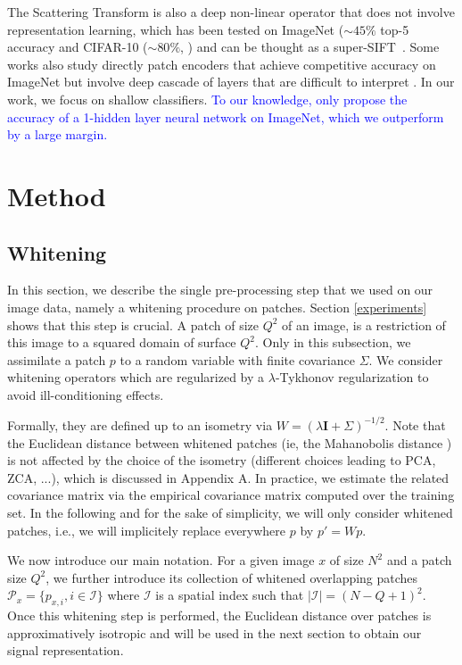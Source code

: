 \documentclass{article}
\newcommand{\Edouard}[1]{\textcolor{blue}{#1}}
\begin{document}
{The Scattering Transform \citep{mallat2012group} is also a deep non-linear operator that does not involve representation learning, which has been tested on ImageNet ($\sim 45\%$ top-5 accuracy \citep{zarka2019deep} and  CIFAR-10 ($\sim 80 \%$, \citep{Oyallon_2015_CVPR}) and can be thought as a super-SIFT~\citep{Oyallon_2018_ECCV}.
Some works also study directly patch encoders that achieve competitive accuracy on ImageNet but involve deep cascade of layers that are difficult to interpret \citep{oyallon2017scaling,zarka2019deep,brendel2019approximating}. In our work, we focus on shallow classifiers. \Edouard{To our knowledge, only \citep{belilovsky2018greedy,belilovsky2019decoupled} propose the accuracy of a 1-hidden layer neural network on ImageNet, which we outperform by a large margin.}

\section{Method}
\label{method}

\subsection{Whitening}

In this section, we describe the single pre-processing step that we used on our image data, namely a whitening procedure on patches. Section \ref{experiments} shows that this step is crucial. A patch of size $Q^2$ of an image, is a  restriction of this image to a squared domain of surface $Q^2$. Only in this subsection, we assimilate a patch $p$ to a random variable with finite covariance $\Sigma$. We consider whitening operators which are regularized by a $\lambda$-Tykhonov regularization to avoid ill-conditioning effects.

Formally, they are defined up to an isometry via $W=(\lambda \mathbf{I}+\Sigma
)^{-1/2}$.  Note that the Euclidean distance between whitened patches (ie, the Mahanobolis distance \citep{chandra1936generalised, mclachlan1999mahalanobis} ) is not affected by the choice of the isometry (different choices leading to PCA, ZCA, ...), which is discussed in Appendix A. In practice, we estimate the related covariance matrix via the empirical covariance matrix  computed over the training set. In the following and for the sake of simplicity, we will only  consider whitened patches, i.e., we will implicitely replace everywhere $p$ by $p'=Wp$.
 
 
We now introduce our main notation. For a given image $x$ of size $N^2$ and a patch size $Q^2$, we further introduce its collection of whitened overlapping patches $\mathcal{P}_x=\{p_{x,i},i\in\mathcal{I}\}$ where $\mathcal{I}$ is a spatial index such that $|\mathcal{I}|=(N-Q+1)
^2$.
Once this whitening step is performed, the Euclidean distance over patches is approximatively isotropic and will be used in the next section to obtain our signal representation.

}
\end{document}
